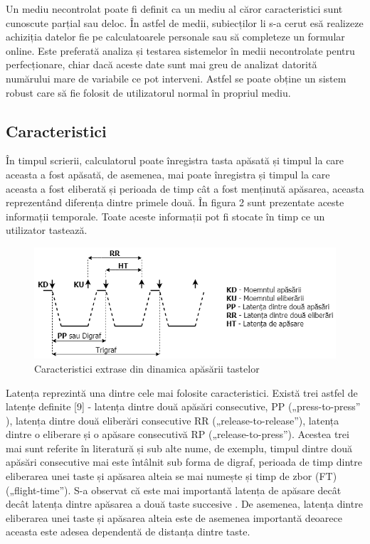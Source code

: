 \documentclass[9pt,shortpaper,twoside,web]{ieeecolor}
\begin{document}
	Un mediu necontrolat poate fi definit ca un mediu al căror caracteristici sunt cunoscute parțial sau deloc. În astfel de medii, subiecților li s-a cerut esă realizeze achiziția datelor fie pe calculatoarele personale sau să completeze un formular online. Este preferată analiza și testarea sistemelor în medii necontrolate pentru perfecționare, chiar dacă aceste date sunt mai greu de analizat datorită numărului mare de variabile ce pot interveni. Astfel se poate obține un sistem robust care să fie folosit de utilizatorul normal în propriul mediu.
	
	
\subsection{Caracteristici}
	În timpul scrierii, calculatorul poate înregistra tasta apăsată și timpul la care aceasta a fost apăsată, de asemenea, mai poate înregistra și timpul la care aceasta a fost eliberată și perioada de timp cât a fost menținută apăsarea, aceasta reprezentând diferența dintre primele două. În figura 2 sunt prezentate aceste informații temporale. Toate aceste informații pot fi stocate în timp ce un utilizator tastează.
	
\begin{figure}[htb]
\includegraphics[width=\columnwidth]{res/fig/caracteristici-extrase}
\caption{ Caracteristici extrase din dinamica apăsării tastelor\cite{b3}}
\label{fig2}
\end{figure}

	Latența reprezintă una dintre cele mai folosite caracteristici. Există trei astfel de latențe definite [9] - latența dintre două apăsări consecutive, PP („press-to-press” ), latența dintre două eliberări consecutive RR („release-to-release”), latența dintre o eliberare și o apăsare consecutivă RP („release-to-press”). Acestea trei mai sunt referite în literatură și sub alte nume, de exemplu, timpul dintre două apăsări consecutive mai este întâlnit sub forma de digraf, perioada de timp dintre eliberarea unei taste și apăsarea alteia se mai numește și timp de zbor (FT) („flight-time”). S-a observat că este mai importantă latența de apăsare decât decât latența dintre apăsarea a două taste succesive \cite{b3}. De asemenea, latența dintre eliberarea unei taste și apăsarea alteia este de asemenea importantă deoarece aceasta este adesea dependentă de distanța dintre taste. 
		
\end{document}
